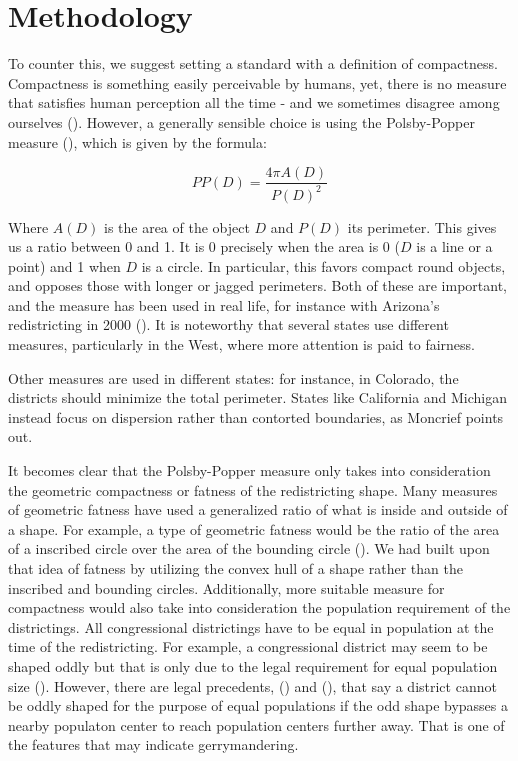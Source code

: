 \documentclass[letterpaper]{article}
\begin{document}
\section{Methodology}
To counter this, we suggest setting a standard with a definition of compactness. Compactness is something easily perceivable by humans, yet, there is no measure that satisfies human perception all the time - and we sometimes disagree among ourselves (\cite{king}).
However, a generally sensible choice is using the Polsby-Popper measure (\cite{polsbypopper}), which is given by the formula:

\[
	PP(D) = \frac{4\pi A(D)}{P(D)^2}
\]


Where $A(D)$ is the area of the object $D$ and $P(D)$ its perimeter. This gives us a ratio between 0 and 1. It is 0 precisely when the area is 0 ($D$ is a line or a point) and 1 when $D$ is a circle. In particular, this favors compact round objects, and opposes those with longer or jagged perimeters. Both of these are important, and the measure has been used in real life, for instance with Arizona’s redistricting in 2000 (\cite{moncrief}). It is noteworthy that several states use different measures, particularly in the West, where more attention is paid to fairness.

Other measures are used in different states: for instance, in Colorado, the districts should minimize the total perimeter. States like California and Michigan instead focus on dispersion rather than contorted boundaries, as Moncrief points out. 

It becomes clear that the Polsby-Popper measure only takes into consideration the geometric compactness or fatness of the redistricting shape. Many measures of geometric fatness have used a generalized ratio of what is inside and outside of a shape. For example, a type of geometric fatness would be the ratio of the area of a inscribed circle over the area of the bounding circle (\cite{fatness}). We had built upon that idea of fatness by utilizing the convex hull of a shape rather than the inscribed and bounding circles. Additionally, more suitable measure for compactness would also take into consideration the population requirement of the districtings. All congressional districtings have to be equal in population at the time of the redistricting. For example, a congressional district may seem to be shaped oddly but that is only due to the legal requirement for equal population size (\cite{westberryVsanders}). However, there are legal precedents, (\cite{sandiego}) and (\cite{california}), that say a district cannot be oddly shaped for the purpose of equal populations if the odd shape bypasses a nearby populaton center to reach population centers further away. That is one of the features that may indicate gerrymandering.
\end{document}
